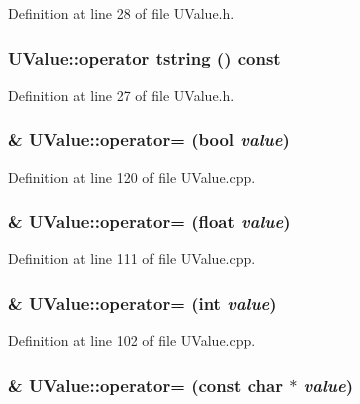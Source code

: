 Definition at line 28 of file UValue.h.\hypertarget{class_u_value_c1730254a5d60be8b9d754a17cbc2819}{
\subsubsection[{operator tstring}]{\setlength{\rightskip}{0pt plus 5cm}UValue::operator {\bf tstring} () const}}
\label{class_u_value_c1730254a5d60be8b9d754a17cbc2819}




Definition at line 27 of file UValue.h.\hypertarget{class_u_value_f9d78d0bae741a67a8b720ec60beb86c}{
\subsubsection[{operator=}]{ \& UValue::operator= (bool {\em value})}}
\label{class_u_value_f9d78d0bae741a67a8b720ec60beb86c}




Definition at line 120 of file UValue.cpp.\hypertarget{class_u_value_17116023ffecbf9d8c8949fe0b2121d3}{
\subsubsection[{operator=}]{ \& UValue::operator= (float {\em value})}}
\label{class_u_value_17116023ffecbf9d8c8949fe0b2121d3}




Definition at line 111 of file UValue.cpp.\hypertarget{class_u_value_99588b29942a28c5c26325e28ca1757f}{
\subsubsection[{operator=}]{ \& UValue::operator= (int {\em value})}}
\label{class_u_value_99588b29942a28c5c26325e28ca1757f}




Definition at line 102 of file UValue.cpp.\hypertarget{class_u_value_b0cd1a325bc763e974ca819bc64d2ac1}{
\subsubsection[{operator=}]{ \& UValue::operator= (const char $\ast$ {\em value})}}
\label{class_u_value_b0cd1a325bc763e974ca819bc64d2ac1}




